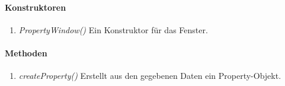 \paragraph{Konstruktoren}
\begin{enumerate}[+]
	\item \textit{PropertyWindow()} Ein Konstruktor für das Fenster.
\end{enumerate}

\paragraph{Methoden}

\begin{enumerate}[+]
	\item \textit{createProperty()} Erstellt aus den gegebenen Daten ein 	Property-Objekt.	
\end{enumerate}


